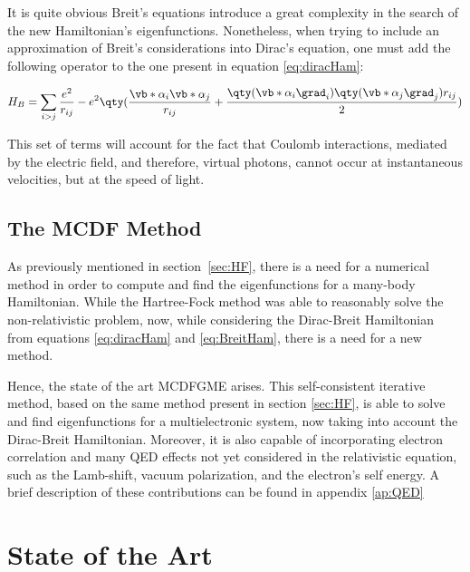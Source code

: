   It is quite obvious Breit's equations introduce a great complexity in the search of the new Hamiltonian's eigenfunctions. Nonetheless, when trying to include an approximation of Breit's considerations into Dirac's equation, one must add the following operator to the one present in equation \eqref{eq:diracHam}:

  \begin{equation}
    H_B = \sum_{i>j}\frac{e^2}{r_{ij}} - e^2\qty(\frac{\vb*{\alpha}_i\vb*{\alpha}_j}{r_{ij}}+\frac{\qty(\vb*{\alpha}_i \grad_i)\qty(\vb*{\alpha}_j \grad_j)r_{ij}}{2})  
    \label{eq:BreitHam}
  \end{equation}

This set of terms will account for the fact that Coulomb interactions, mediated by the electric field, and therefore, \gls{virtual photons}, cannot occur at instantaneous velocities, but at the speed of light.

\subsection{The \gls{MCDF} Method}

As previously mentioned in section~\ref{sec:HF}, there is a need for a numerical method in order to compute and find the eigenfunctions for a many-body Hamiltonian. While the Hartree-Fock method was able to reasonably solve the non-relativistic problem, now, while considering the Dirac-Breit Hamiltonian from equations \eqref{eq:diracHam} and \eqref{eq:BreitHam}, there is a need for a new method.

Hence, the state of the art \gls{MCDFGME} arises. This self-consistent iterative method, based on the same method present in section \ref{sec:HF}, is able to solve and find eigenfunctions for a multielectronic system, now taking into account the Dirac-Breit Hamiltonian. Moreover, it is also capable of incorporating electron correlation and many QED effects not yet considered in the relativistic equation, such as the Lamb-shift, vacuum polarization, and the electron's self energy.
A brief description of these contributions can be found in  appendix \ref{ap:QED}




\section{State of the Art}



